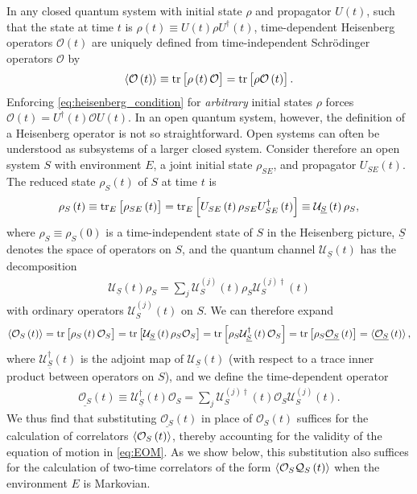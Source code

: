 \documentclass[aps,pra,twocolumn,longbibliography]{revtex4-2}
\newcommand{\p}[1]{\left( #1 \right)} %
\renewcommand{\sp}[1]{\left[ #1 \right]} %
\newcommand{\bk}{\braket} %
\newcommand{\ul}{\underline} %
\renewcommand{\O}{\mathcal{O}}
\newcommand{\Q}{\mathcal{Q}}
\newcommand{\U}{\mathcal{U}}
\newcommand{\1}{\mathds{1}}
\begin{document}
In any closed quantum system with initial state $\rho$ and propagator
$U\p{t}$, such that the state at time $t$ is
$\rho\p{t}\equiv U\p{t}\rho U^\dag\p{t}$, time-dependent Heisenberg
operators $\O\p{t}$ are uniquely defined from time-independent
Schr\"odinger operators $\O$ by
\begin{align}
  \bk{\O\p{t}} \equiv \tr\sp{\rho\p{t}\O} = \tr\sp{\rho\O\p{t}}.
  \label{eq:heisenberg_condition}
\end{align}
Enforcing \eqref{eq:heisenberg_condition} for {\it arbitrary} initial
states $\rho$ forces $\O\p{t}=U^\dag\p{t}\O U\p{t}$.  In an open
quantum system, however, the definition of a Heisenberg operator is
not so straightforward.  Open systems can often be understood as
subsystems of a larger closed system.  Consider therefore an open
system $S$ with environment $E$, a joint initial state $\rho_{SE}$,
and propagator $U_{SE}\p{t}$.  The reduced state $\rho_S\p{t}$ of $S$
at time $t$ is
\begin{align}
  \rho_S\p{t}
  \equiv \tr_E\sp{\rho_{SE}\p{t}}
  = \tr_E\sp{U_{SE}\p{t} \rho_{SE} U_{SE}^\dag\p{t}}
  \equiv \U_{\ul S}\p{t} \rho_S,
  \label{eq:state_S}
\end{align}
where $\rho_S\equiv\rho_S\p{0}$ is a time-independent state of $S$ in
the Heisenberg picture, $\ul S$ denotes the space of operators on $S$,
and the quantum channel $\U_{\ul S}\p{t}$ has the
decomposition\cite{rivas2012time}
\begin{align}
  \U_{\ul S}\p{t} \rho_S
  = \sum_j \U_S^{(j)}\p{t} \rho_S \U_S^{(j)\dag}\p{t}
\end{align}
with ordinary operators $\U_S^{(j)}\p{t}$ on $S$.  We can therefore
expand
\begin{align}
  \bk{\O_S\p{t}}
  = \tr\sp{\rho_S\p{t}\O_S}
  = \tr\sp{\U_{\ul S}\p{t} \rho_S \O_S}
  = \tr\sp{\rho_S \U_{\ul S}^\dag\p{t} \O_S}
  = \tr\sp{\rho_S \ul{\O_S}\p{t}}
  = \bk{\ul{\O_S}\p{t}},
  \label{eq:heisenberg_correlator}
\end{align}
where $\U_{\ul S}^\dag\p{t}$ is the adjoint map of $\U_{\ul S}\p{t}$
(with respect to a trace inner product between operators on $S$), and
we define the time-dependent operator
\begin{align}
  \ul{\O_S}\p{t}
  \equiv \U_{\ul S}^\dag\p{t} \O_S
  = \sum_j \U_S^{(j)\dag}\p{t} \O_S \U_S^{(j)}\p{t}.
  \label{eq:heisenberg_wrong}
\end{align}
We thus find that substituting $\ul{\O_S}\p{t}$ in place of
$\O_S\p{t}$ suffices for the calculation of correlators
$\bk{\O_S\p{t}}$, thereby accounting for the validity of the equation
of motion in \eqref{eq:EOM}.  As we show below, this substitution also
suffices for the calculation of two-time correlators of the form
$\bk{\O_S\Q_S\p{t}}$ when the environment $E$ is Markovian.
\end{document}
